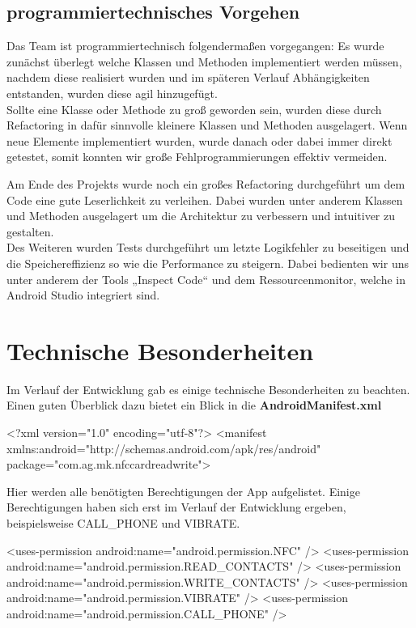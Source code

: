\documentclass[a4paper,ngerman,12pt]{scrreprt}
\begin{document}
\subsection{programmiertechnisches Vorgehen}

Das Team ist programmiertechnisch folgendermaßen vorgegangen: Es wurde zunächst überlegt welche Klassen und Methoden implementiert werden müssen, nachdem diese realisiert wurden und im späteren Verlauf Abhängigkeiten entstanden, wurden diese agil hinzugefügt. \\
Sollte eine Klasse oder Methode zu groß geworden sein, wurden diese durch \ac{Refactoring} in dafür sinnvolle kleinere Klassen und Methoden ausgelagert. Wenn neue Elemente implementiert wurden, wurde danach oder dabei immer direkt getestet, somit konnten wir große Fehlprogrammierungen effektiv vermeiden.

Am Ende des Projekts wurde noch ein großes Refactoring durchgeführt um dem Code eine gute Leserlichkeit zu verleihen. Dabei wurden unter anderem Klassen und Methoden ausgelagert um die Architektur zu verbessern und intuitiver zu gestalten. \\
Des Weiteren wurden Tests durchgeführt um letzte Logikfehler zu beseitigen und die Speichereffizienz so wie die Performance zu steigern. Dabei bedienten wir uns unter anderem der Tools „Inspect Code“ und dem Ressourcenmonitor, welche in Android Studio integriert sind.

\section{Technische Besonderheiten}

Im Verlauf der Entwicklung gab es einige technische Besonderheiten zu beachten. Einen guten Überblick dazu bietet ein Blick in die {\bfseries AndroidManifest.xml} \begin{DoxyVerb}<?xml version="1.0" encoding="utf-8"?>
<manifest xmlns:android="http://schemas.android.com/apk/res/android"
    package="com.ag.mk.nfccardreadwrite">
\end{DoxyVerb}


Hier werden alle benötigten Berechtigungen der App aufgelistet. Einige Berechtigungen haben sich erst im Verlauf der Entwicklung ergeben, beispielsweise CALL\_PHONE und VIBRATE. \begin{DoxyVerb}    <uses-permission android:name="android.permission.NFC" />
    <uses-permission android:name="android.permission.READ_CONTACTS" />
    <uses-permission android:name="android.permission.WRITE_CONTACTS" />
    <uses-permission android:name="android.permission.VIBRATE" />
    <uses-permission android:name="android.permission.CALL_PHONE" />
\end{DoxyVerb}
\end{document}
